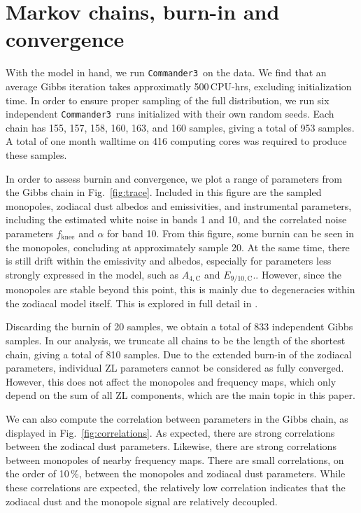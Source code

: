 \documentclass{aa}
\def\commanderthree{\texttt{Commander3}}
\begin{document}


\section{Markov chains, burn-in and convergence}
\label{sec:chains}


With the model in hand, we run \commanderthree\ on the data. We find that an average Gibbs iteration takes approximatly 500\,CPU-hrs, excluding initialization time. In order to ensure proper sampling of the full distribution, we run six independent \commanderthree\ runs initialized with their own random seeds. Each chain has 155, 157, 158, 160, 163, and 160 samples, giving a total of 953 samples. A total of one month walltime on 416 computing cores was required to produce these samples.

In order to assess burnin and convergence, we plot a range of parameters from the Gibbs chain in Fig.~\ref{fig:trace}. Included in this figure are the sampled monopoles, zodiacal dust albedos and emissivities, and instrumental parameters, including the estimated white noise in bands 1 and 10, and the correlated noise parameters $f_\mathrm{knee}$ and $\alpha$ for band 10. From this figure, some burnin can be seen in the monopoles, concluding at approximately sample 20.  At the same time, there is still drift within the emissivity and albedos, especially for parameters less strongly expressed in the model, such as $A_{4,\mathrm C}$ and $E_{9/10,\mathrm C}$.. However, since the monopoles are stable beyond this point, this is mainly due to degeneracies within the zodiacal model itself. This is explored in full detail in \citet{CG02_02}.

Discarding the burnin of 20 samples, we obtain a total of 833 independent Gibbs samples. In our analysis, we truncate all chains to be the length of the shortest chain, giving a total of 810 samples. Due to the extended burn-in of the zodiacal parameters, individual ZL parameters cannot be considered as fully converged. However, this does not affect the monopoles and frequency maps, which only depend on the sum of all ZL components, which are the main topic in this paper.

We can also compute the correlation between parameters in the Gibbs chain, as displayed in Fig.~\ref{fig:correlations}.  As expected, there are strong correlations between the zodiacal dust parameters. Likewise, there are strong correlations between monopoles of nearby frequency maps. There are small correlations, on the order of 10\,\%, between the monopoles and zodiacal dust parameters. While these correlations are expected, the relatively low correlation indicates that the zodiacal dust and the monopole signal are relatively decoupled.
\end{document}
